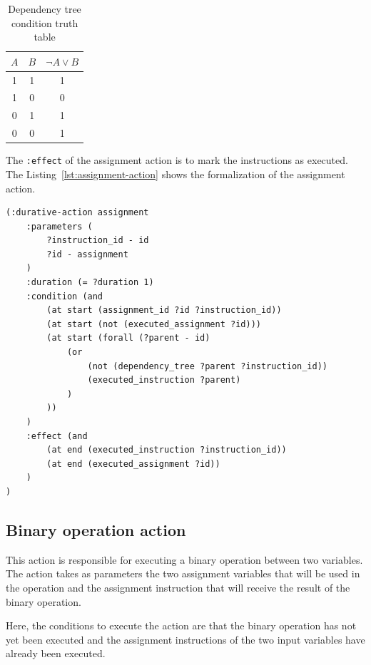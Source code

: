 \documentclass[letterpaper]{article}
\begin{document}
\begin{table}[h]
    \centering
    \begin{tabular}{|c|c|c|}
        \hline
        $A$ & $B$ & $\neg A \lor B$ \\
        \hline
        1   & 1   & 1               \\
        1   & 0   & 0               \\
        0   & 1   & 1               \\
        0   & 0   & 1               \\
        \hline
    \end{tabular}
    \caption{Dependency tree condition truth table}
    \label{table:forall-truth-table}
\end{table}

The \texttt{:effect} of the assignment action is to mark the instructions as executed. The Listing~\ref{lst:assignment-action} shows the formalization of the assignment action.

\begin{lstlisting}[caption=Formalization of the assignment action,label=lst:assignment-action,style=pddlStyle]
(:durative-action assignment
    :parameters (
        ?instruction_id - id
        ?id - assignment
    )
    :duration (= ?duration 1)
    :condition (and
        (at start (assignment_id ?id ?instruction_id))
        (at start (not (executed_assignment ?id)))
        (at start (forall (?parent - id)
            (or
                (not (dependency_tree ?parent ?instruction_id))
                (executed_instruction ?parent)
            )
        ))
    )
    :effect (and
        (at end (executed_instruction ?instruction_id))
        (at end (executed_assignment ?id))
    )
)
\end{lstlisting}

\subsection{Binary operation action}

This action is responsible for executing a binary operation between two variables. The action takes as parameters the two assignment variables that will be used in the operation and the assignment instruction that will receive the result of the binary operation.

Here, the conditions to execute the action are that the binary operation has not yet been executed and the assignment instructions of the two input variables have already been executed.
\end{document}
